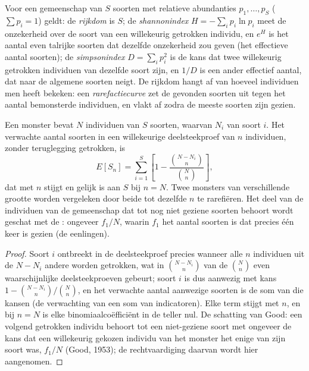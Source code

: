 \begin{definition}[Diversiteit]\label{def:b3:microbiomes:diversity}
Voor een gemeenschap van $S$ soorten met relatieve abundanties
$p_{1},\dots,
p_{S}$ ($\sum p_{i} = 1$) geldt: de \emph{rijkdom} is $S$; de
\emph{shannonindex} $H = -\sum_{i} p_{i}\ln p_{i}$ meet de
onzekerheid over de soort van een willekeurig getrokken individu, en
$e^{H}$ is het aantal even talrijke soorten dat dezelfde onzekerheid
zou geven (het effectieve aantal soorten); de \emph{simpsonindex}
$D = \sum_{i} p_{i}^{2}$ is de kans dat twee willekeurig getrokken
individuen van dezelfde soort zijn, en $1/D$ is een ander effectief
aantal, dat naar de algemene soorten neigt. De rijkdom hangt af van
hoeveel individuen men heeft bekeken: een \emph{rarefactiecurve} zet de
gevonden soorten uit tegen het aantal bemonsterde individuen, en vlakt
af zodra de meeste soorten zijn gezien.
\end{definition}

\begin{theorem}[Rarefactie]\label{thm:b3:microbiomes:rarefaction}
Een monster bevat $N$ individuen van $S$ soorten, waarvan $N_{i}$ van
soort $i$. Het verwachte aantal soorten in een willekeurige deelsteekproef
van $n$ individuen, zonder teruglegging getrokken, is
\[
E[S_{n}] = \sum_{i=1}^{S}\left[1 - \frac{\binom{N - N_{i}}{n}}
{\binom{N}{n}}\right],
\]
dat met $n$ stijgt en gelijk is aan $S$ bij $n = N$. Twee monsters van
verschillende grootte worden vergeleken door beide tot dezelfde $n$ te
rarefiëren. Het deel van de individuen van de gemeenschap dat tot nog
niet geziene soorten behoort wordt geschat met de \emph{}: ongeveer $f_{1}/N$, waarin $f_{1}$ het aantal soorten is dat
precies één keer is gezien (de eenlingen).
\end{theorem}
\begin{proof}
Soort $i$ ontbreekt in de deelsteekproef precies wanneer alle $n$
individuen uit de $N - N_{i}$ andere worden getrokken, wat in
$\binom{N - N_{i}}{n}$ van de $\binom{N}{n}$ even waarschijnlijke
deelsteekproeven gebeurt; soort $i$ is dus aanwezig met kans
$1 - \binom{N-N_{i}}{n}/
\binom{N}{n}$, en het verwachte aantal aanwezige soorten is de som van
die kansen (de verwachting van een som van indicatoren). Elke term
stijgt met $n$, en bij $n = N$ is elke binomiaalcoëfficiënt in de teller
nul. De schatting van Good: een volgend getrokken individu behoort tot
een niet-geziene soort met ongeveer de kans dat een willekeurig gekozen
individu van het monster het enige van zijn soort was, $f_{1}/N$ (Good,
1953); de rechtvaardiging daarvan wordt hier aangenomen.
\end{proof}

